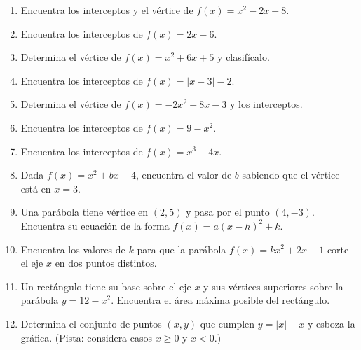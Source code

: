\documentclass[12pt, letterpaper]{article}
\begin{document}
\begin{enumerate}[resume=ejercicios, leftmargin=*]
  \item \facil{} Encuentra los interceptos y el vértice de $f(x) = x^2 - 2x - 8$.

  \item \facil{} Encuentra los interceptos de $f(x) = 2x - 6$.

  \item \facil{} Determina el vértice de $f(x) = x^2 + 6x + 5$ y clasifícalo.

  \item \facil{} Encuentra los interceptos de $f(x) = |x - 3| - 2$.

  \item \medio{} Determina el vértice de $f(x) = -2x^2 + 8x - 3$ y los interceptos.

  \item \medio{} Encuentra los interceptos de $f(x) = 9 - x^2$.

  \item \medio{} Encuentra los interceptos de $f(x) = x^3 - 4x$.

  \item \medio{} Dada $f(x) = x^2 + bx + 4$, encuentra el valor de $b$ sabiendo que el vértice está en $x = 3$.

  \item \dificil{} Una parábola tiene vértice en $(2, 5)$ y pasa por el punto $(4, -3)$. Encuentra su ecuación de la forma $f(x) = a(x - h)^2 + k$.

  \item \dificil{} Encuentra los valores de $k$ para que la parábola $f(x) = kx^2 + 2x + 1$ corte el eje $x$ en dos puntos distintos.

  \item \dificil{} Un rectángulo tiene su base sobre el eje $x$ y sus vértices superiores sobre la parábola $y = 12 - x^2$. Encuentra el área máxima posible del rectángulo.

  \item \dificil{} Determina el conjunto de puntos $(x, y)$ que cumplen $y = |x| - x$ y esboza la gráfica. (Pista: considera casos $x \geq 0$ y $x < 0$.)
\end{enumerate}


\end{document}
